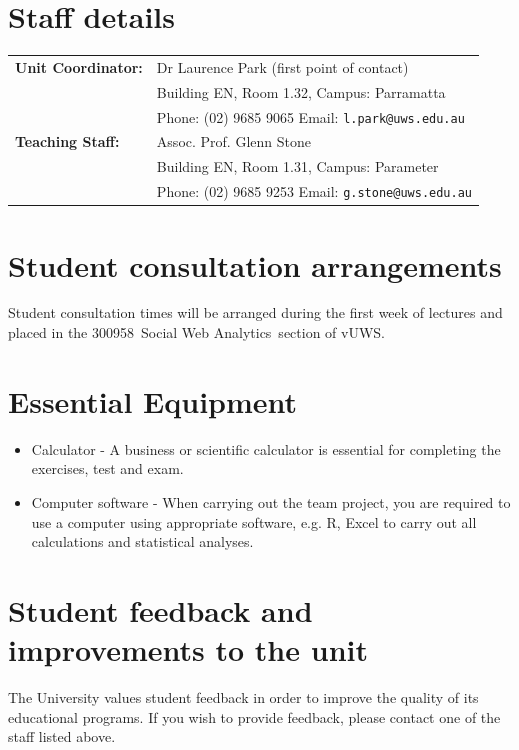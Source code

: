 \documentclass[a4paper,oneside]{book}
\newcommand{\vuws}{vUWS}
\newcommand{\unitcode}{300958}
\newcommand{\unitname}{Social Web Analytics}
\begin{document}
\section{Staff details}
\begin{tabular}{ll}
  \textbf{Unit Coordinator:}  & Dr Laurence Park (first point of
  contact) \\
  & Building EN, Room 1.32, Campus: Parramatta \\
  & Phone: (02) 9685 9065 \quad
  Email: \texttt{l.park@uws.edu.au} \\[0.5em]

   \textbf{Teaching Staff:} & Assoc. Prof. Glenn Stone \\
   & Building EN, Room 1.31, Campus: Parameter \\
   & Phone: (02) 9685 9253 \quad
   Email: \texttt{g.stone@uws.edu.au} \\[0.5em]

\end{tabular}

\section{Student consultation arrangements}

Student consultation times will be arranged during the first week of
lectures and placed in the \unitcode~\unitname~section of \vuws.

\section{Essential Equipment}

\begin{itemize}
\item Calculator - A business or scientific calculator is essential
  for completing the exercises, test and exam.
\item Computer software - When carrying out the team project, you are
  required to use a computer using appropriate software, e.g. R, Excel to
  carry out all calculations and statistical analyses.
\end{itemize}
  
\section{Student feedback and improvements to the unit}

The University values student feedback in order to improve the quality
of its educational programs. If you wish to provide feedback, please
contact one of the staff listed above.
\end{document}
